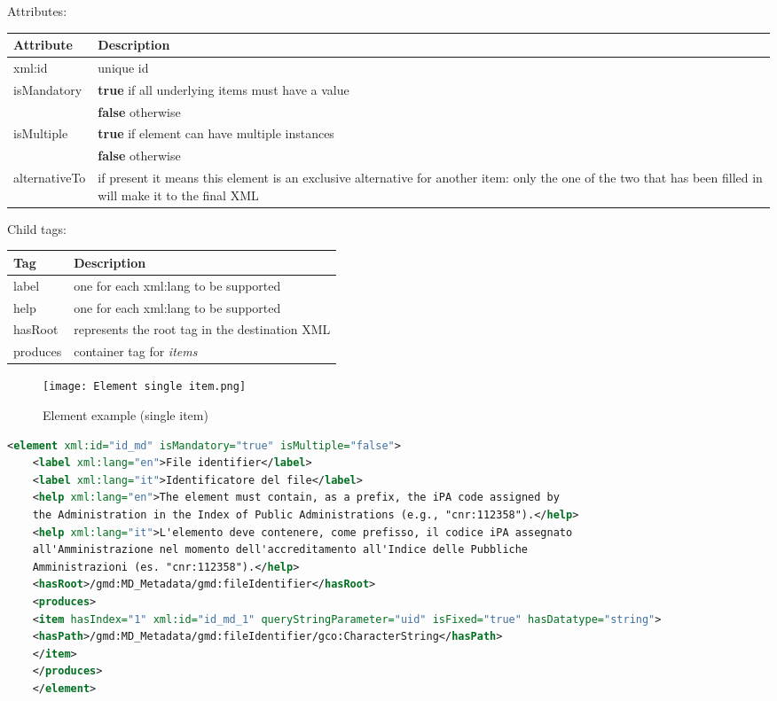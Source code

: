 Attributes:
\begin{center}
	\begin{tabular}{ | p{} | p{} | }
		\hline
		Attribute & Description \\ 
		\hline
		xml:id & unique id \\
		\hline
		isMandatory & \textbf{true} if all underlying items must have a value \\ & \textbf{false} otherwise \\
		\hline
		isMultiple & \textbf{true} if element can have multiple instances \\ & \textbf{false} otherwise  \\
		\hline
		alternativeTo & if present it means this element is an exclusive alternative for another item: only the one of the two that has been filled in will make it to the final XML \\
		\hline
	\end{tabular}
\end{center}

Child tags:
\begin{center}
	\begin{tabular}{ | p{} | p{} | }
		\hline
		Tag & Description \\ 
		\hline
		label & one for each xml:lang to be supported \\
		help & one for each xml:lang to be supported \\
		\hline
		hasRoot & represents the root tag in the destination XML \\
		\hline
		produces & container tag for \textit{items} \\
		\hline
		
	\end{tabular}
\end{center}

\begin{figure}[h]
	\caption{Element example (single item)}
	\texttt{[image: Element single item.png]}
	\centering
\end{figure}

\begin{lstlisting}[language=XML]
	<element xml:id="id_md" isMandatory="true" isMultiple="false">
	<label xml:lang="en">File identifier</label>
	<label xml:lang="it">Identificatore del file</label>
	<help xml:lang="en">The element must contain, as a prefix, the iPA code assigned by 
	the Administration in the Index of Public Administrations (e.g., "cnr:112358").</help>
	<help xml:lang="it">L'elemento deve contenere, come prefisso, il codice iPA assegnato
	all'Amministrazione nel momento dell'accreditamento all'Indice delle Pubbliche
	Amministrazioni (es. "cnr:112358").</help>
	<hasRoot>/gmd:MD_Metadata/gmd:fileIdentifier</hasRoot>
	<produces>
	<item hasIndex="1" xml:id="id_md_1" queryStringParameter="uid" isFixed="true" hasDatatype="string">
	<hasPath>/gmd:MD_Metadata/gmd:fileIdentifier/gco:CharacterString</hasPath>
	</item>
	</produces>
	</element>
\end{lstlisting}

